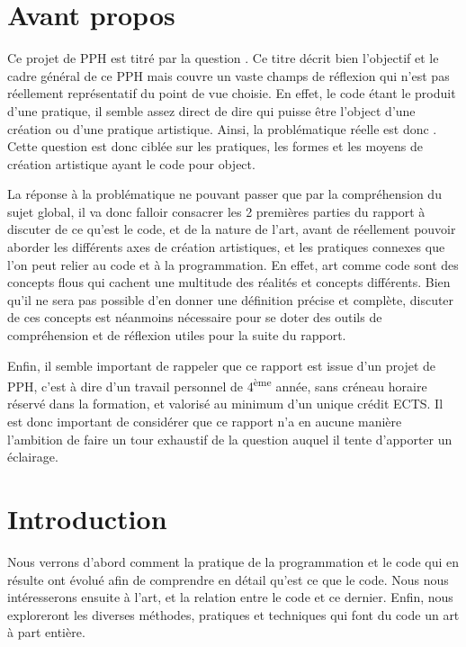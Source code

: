 \documentclass[12pt]{article} %
\newcommand{\ts}{\textsuperscript} %
\begin{document}
\section*{Avant propos}
Ce projet de PPH est titré par la question . Ce titre décrit bien l'objectif et le cadre général de ce PPH mais couvre un vaste champs de réflexion qui n'est pas réellement représentatif du point de vue choisie. En effet, le code étant le produit d'une pratique, il semble assez direct de dire qui puisse être l'object d'une création ou d'une pratique artistique. Ainsi, la problématique réelle est donc . Cette question est donc ciblée sur les pratiques, les formes et les moyens de création artistique ayant le code pour object.

La réponse à la problématique ne pouvant passer que par la compréhension du sujet global, il va donc falloir consacrer les 2 premières parties du rapport à discuter de ce qu'est le code, et de la nature de l'art, avant de réellement pouvoir aborder les différents axes de création artistiques, et les pratiques connexes que l'on peut relier au code et à la programmation. En effet, art comme code sont des concepts flous qui cachent une multitude des réalités et concepts différents. Bien qu'il ne sera pas possible d'en donner une définition précise et complète, discuter de ces concepts est néanmoins nécessaire pour se doter des outils de compréhension et de réflexion utiles pour la suite du rapport.

Enfin, il semble important de rappeler que ce rapport est issue d'un projet de PPH, c'est à dire d'un travail personnel de 4\ts{ème} année, sans créneau horaire réservé dans la formation, et valorisé au minimum d'un unique crédit ECTS. Il est donc important de considérer que ce rapport n'a en aucune manière l'ambition de faire un tour exhaustif de la question auquel il tente d'apporter un éclairage.

\newpage
\tableofcontents

\newpage
{} %

\section{Introduction}
Nous verrons d'abord comment la pratique de la programmation et le code qui en résulte ont évolué afin de comprendre en détail qu'est ce que le code. Nous nous intéresserons ensuite à l'art, et la relation entre le code et ce dernier. Enfin, nous exploreront les diverses méthodes, pratiques et techniques qui font du code un art à part entière.
\end{document}
